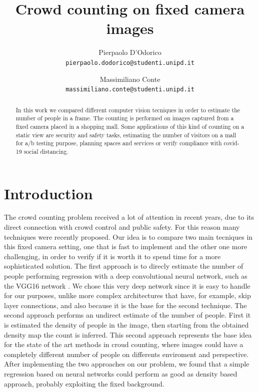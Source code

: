 \documentclass[10pt,twocolumn,letterpaper]{article}
\begin{document}
\title{Crowd counting on fixed camera images}

\author{Pierpaolo D'Odorico\\
{\tt\small pierpaolo.dodorico@studenti.unipd.it}
\and
Massimiliano Conte\\
{\tt\small massimiliano.conte@studenti.unipd.it}
}


\maketitle
\begin{abstract}



In this work we compared different computer vision tecniques in order to estimate the number of people in a frame. The counting is performed on images captured from a fixed camera placed in a shopping mall. Some applications of this kind of counting on a static view are security and safety tasks, estimating the number of visitors on a mall for a/b testing purpose, planning spaces and services or verify compliance with covid-19 social distancing.

\end{abstract}

\section{Introduction}

The crowd counting problem received a lot of attention in recent years, due to its direct connection with crowd control and public safety. For this reason many techniques were recently proposed.
Our idea is to compare two main tecniques in this fixed camera setting, one that is fast to implement and the other one more challenging, in order to verify if it is worth it to spend time for a more sophisticated solution. The first approach is to direcly estimate the number of people performing regression with a deep convolutional neural network, such as the VGG16 network \cite{simonyan2014very}. We chose this very deep network since it is easy to handle for our purposes, unlike more complex architectures that have, for example, skip layer connections, and also because it is the base for the second technique. The second approach performs an undirect estimate of the number of people. First it is estimated the density of people in the image, then starting from the obtained density map the count is inferred. This second approach represents the base idea for the state of the art methods in croud counting, where images could have a completely different number of people on  differents enviroment and perspective. After implementing the two approaches on our problem, we found that a simple regression based on neural networks could perform as good as density based approach, probably exploiting the fixed background.
\end{document}
